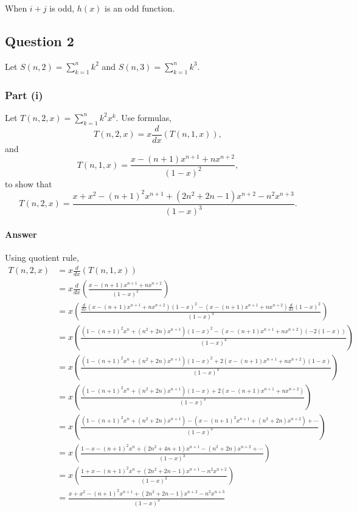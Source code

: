 When $ i + j $ is odd, $ h(x) $ is an odd function.

\subsection{Question 2}
Let $ S(n,2) = \sum_{k=1}^{n} k^2 $ and $ S(n,3) = \sum_{k=1}^{n} k^3 $.

\subsubsection{Part (i)}
Let $ T(n,2,x) = \sum_{k=1}^{n} k^2 x^k $. Use formulas,
\begin{equation*}
    T(n, 2, x) = x \frac{d}{dx} (T(n, 1, x)),
\end{equation*}
and
\begin{equation*}
    T(n, 1, x) = \frac{x - (n + 1) x^{n + 1} + n x^{n + 2}}{(1 - x)^2},
\end{equation*}
to show that
\begin{equation*}
    T(n, 2, x) = \frac{x + x^2 - (n + 1)^2 x^{n + 1} + (2 n^2 + 2 n - 1) x^{n + 2} - n^2 x^{n + 3}}{(1 - x)^3}.
\end{equation*}

\paragraph{Answer}
Using quotient rule,
\begin{align*}
    T(n, 2, x) &= x \frac{d}{dx} (T(n, 1, x)) \\
               &= x \frac{d}{dx} \left( \frac{x - (n + 1) x^{n + 1} + n x^{n + 2}}{(1 - x)^2} \right) \\
               &= x \left( \frac{\frac{d}{dx} (x - (n + 1) x^{n + 1} + n x^{n + 2}) (1 - x)^2 - (x - (n + 1) x^{n + 1} + n x^{n + 2}) \frac{d}{dx} (1 - x)^2}{(1 - x)^4} \right) \\
               &= x \left( \frac{(1 - (n + 1)^2 x^n + (n^2 + 2 n) x^{n + 1})(1 - x)^2 - (x - (n + 1) x^{n + 1} + n x^{n + 2}) (-2(1 - x))}{(1 - x)^4} \right) \\
               &= x \left( \frac{(1 - (n + 1)^2 x^n + (n^2 + 2 n) x^{n + 1})(1 - x)^2 + 2 (x - (n + 1) x^{n + 1} + n x^{n + 2}) (1 - x)}{(1 - x)^4} \right) \\
               &= x \left( \frac{(1 - (n + 1)^2 x^n + (n^2 + 2 n) x^{n + 1})(1 - x) + 2 (x - (n + 1) x^{n + 1} + n x^{n + 2})}{(1 - x)^3} \right) \\
               &= x \left( \frac{(1 - (n + 1)^2 x^n + (n^2 + 2 n) x^{n + 1}) - (x - (n + 1)^2 x^{n + 1} + (n^2 + 2 n) x^{n + 2}) + \cdots}{(1 - x)^3} \right) \\
               &= x \left( \frac{1 - x - (n + 1)^2 x^n + (2n^2 + 4 n + 1) x^{n + 1} - (n^2 + 2 n) x^{n + 2} + \cdots}{(1 - x)^3} \right) \\
               &= x \left( \frac{1 + x - (n + 1)^2 x^n + (2n^2 + 2 n - 1) x^{n + 1} - n^2 x^{n + 2}}{(1 - x)^3} \right) \\
               &= \frac{x + x^2 - (n + 1)^2 x^{n + 1} + (2n^2 + 2 n - 1) x^{n + 2} - n^2 x^{n + 3}}{(1 - x)^3}
\end{align*}

